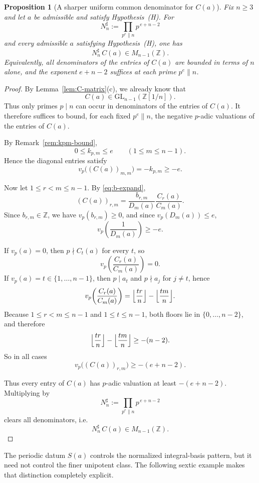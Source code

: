 \documentclass[11pt,letterpaper]{amsart}
\newcommand{\Z}{\mathbb{Z}}
\newcommand{\GL}{\mathrm{GL}}
\theoremstyle{plain}
\newtheorem{proposition}[theorem]{Proposition}
\theoremstyle{definition}
\begin{document}
\begin{proposition}[A sharper uniform common denominator for \(C(a)\)]
\label{prop:uniform-denominator}
Fix \(n\ge 3\) and let $a$ be admissible and satisfy Hypothesis~\textup{(H)}.
For
\[
N_n^{\sharp}:=\prod_{p^e\parallel n} p^{\,e+n-2}
\]
and every admissible \(a\) satisfying Hypothesis~\textup{(H)}, one has
\[
N_n^{\sharp}\,C(a)\in M_{n-1}(\Z).
\]
Equivalently, all denominators of the entries of \(C(a)\) are bounded in terms
of \(n\) alone, and the exponent \(e+n-2\) suffices at each prime
\(p^e\parallel n\).
\end{proposition}

\begin{proof}
By Lemma~\ref{lem:C-matrix}\textup{(c)}, we already know that
\[
C(a)\in \GL_{n-1}(\Z[1/n]).
\]
Thus only primes \(p\mid n\) can occur in denominators of the entries of \(C(a)\). It
therefore suffices to bound, for each fixed \(p^e\parallel n\), the negative \(p\)-adic
valuations of the entries of \(C(a)\).

By Remark~\ref{rem:kpm-bound},
\[
0\le k_{p,m}\le e\qquad(1\le m\le n-1).
\]
Hence the diagonal entries satisfy
\[
v_p\bigl((C(a))_{m,m}\bigr)=-k_{p,m}\ge -e.
\]

Now let \(1\le r<m\le n-1\). By \eqref{eq:b-expand},
\[
(C(a))_{r,m}
=
\frac{b_{r,m}}{D_m(a)}\frac{C_r(a)}{C_m(a)}.
\]
Since \(b_{r,m}\in\Z\), we have \(v_p(b_{r,m})\ge 0\), and since \(v_p(D_m(a))\le e\),
\[
v_p\!\left(\frac1{D_m(a)}\right)\ge -e.
\]

If \(v_p(a)=0\), then \(p\nmid C_t(a)\) for every \(t\), so
\[
v_p\!\left(\frac{C_r(a)}{C_m(a)}\right)=0.
\]
If \(v_p(a)=t\in\{1,\dots,n-1\}\), then \(p\mid a_t\) and \(p\nmid a_j\) for \(j\neq t\), hence
\[
v_p\!\left(\frac{C_r(a)}{C_m(a)}\right)
=
\Bigl\lfloor\frac{tr}{n}\Bigr\rfloor-\Bigl\lfloor\frac{tm}{n}\Bigr\rfloor.
\]
Because \(1\le r<m\le n-1\) and \(1\le t\le n-1\), both floors lie in \(\{0,\dots,n-2\}\), and
therefore
\[
\Bigl\lfloor\frac{tr}{n}\Bigr\rfloor-\Bigl\lfloor\frac{tm}{n}\Bigr\rfloor
\ge -(n-2).
\]
So in all cases
\[
v_p\bigl((C(a))_{r,m}\bigr)\ge -(e+n-2).
\]

Thus every entry of \(C(a)\) has \(p\)-adic valuation at least \(-(e+n-2)\). Multiplying by
\[
N_n^{\sharp}:=\prod_{p^e\parallel n} p^{\,e+n-2}
\]
clears all denominators, i.e.
\[
N_n^{\sharp}\,C(a)\in M_{n-1}(\Z).
\]
\end{proof}



The periodic datum \(S(a)\) controls the normalized integral-basis pattern, but it need not control the finer unipotent class. The following sextic example makes that distinction completely explicit.
\end{document}
